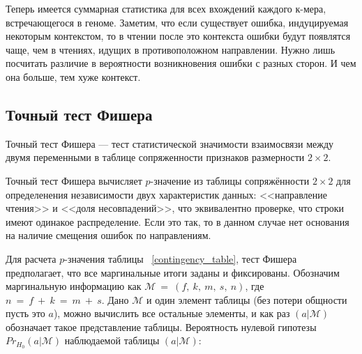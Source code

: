 Теперь имеется суммарная статистика для всех вхождений каждого к-мера, встречающегося в геноме. Заметим, что если существует ошибка, индуцируемая некоторым контекстом, то в чтении после это контекста ошибки будут появлятся чаще, чем в чтениях, идущих в противоположном направлении. Нужно лишь посчитать различие в вероятности возникновения ошибки с разных сторон. И чем она больше, тем хуже контекст. 

\subsection{Точный тест Фишера}

Точный тест Фишера --- тест статистической значимости взаимосвязи между двумя переменными в таблице сопряженности признаков размерности $2 \times 2$.

Точный тест Фишера вычисляет $p$-значение из таблицы сопряжённости $2 \times 2$ для определенения независимости двух характеристик данных: <<направление чтения>> и <<доля несовпадений>>, что эквивалентно проверке, что строки имеют одинакое распределение. Если это так, то в данном случае нет основания на наличие смещения ошибок по направлениям. 

\begin{table}[!h]
\begin{center}
\end{center}
\captionsetup{justification=centering}
\caption{Таблица сопряженности $2 \times 2$.}
\label{contingency_table}
\end{table} 

Для расчета $p$-значения таблицы ~\ref{contingency_table}, тест Фишера предполагает, что все маргинальные итоги заданы и фиксированы. Обозначим маргинальную информацию как $\mathcal{M}\ =\ (f,\ k,\ m,\ s,\ n)$, где $n\ =\ f\ +\ k\ =\ m\ +\ s$. Дано $\mathcal{M}$ и один элемент таблицы (без потери общности пусть это $a$), можно вычислить все остальные элементы, и как раз $(a|\mathcal{M})$ обозначает такое представление таблицы. Вероятность нулевой гипотезы $Pr_{H_0}(a|\mathcal{M})$ наблюдаемой таблицы $(a|\mathcal{M})$:

